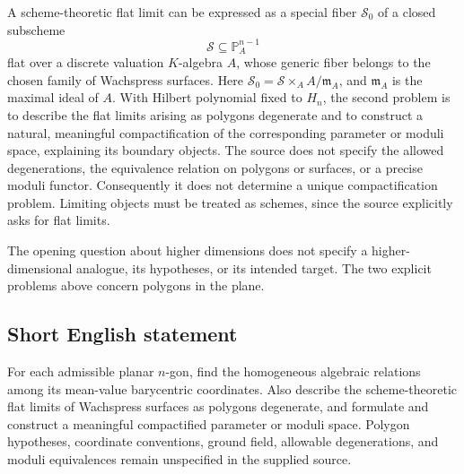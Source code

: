 \documentclass[11pt]{article}
\begin{document}
A scheme-theoretic flat limit can be expressed as a special fiber \(\mathcal S_0\) of a closed subscheme
\[
\mathcal S\subseteq\mathbb P^{n-1}_A
\]
flat over a discrete valuation \(K\)-algebra \(A\), whose generic fiber belongs to the chosen family of Wachspress surfaces. Here \(\mathcal S_0=\mathcal S\times_A A/\mathfrak m_A\), and \(\mathfrak m_A\) is the maximal ideal of \(A\). With Hilbert polynomial fixed to \(H_n\), the second problem is to describe the flat limits arising as polygons degenerate and to construct a natural, meaningful compactification of the corresponding parameter or moduli space, explaining its boundary objects. The source does not specify the allowed degenerations, the equivalence relation on polygons or surfaces, or a precise moduli functor. Consequently it does not determine a unique compactification problem. Limiting objects must be treated as schemes, since the source explicitly asks for flat limits.

The opening question about higher dimensions does not specify a higher-dimensional analogue, its hypotheses, or its intended target. The two explicit problems above concern polygons in the plane.
\subsection{Short English statement}
For each admissible planar \(n\)-gon, find the homogeneous algebraic relations among its mean-value barycentric coordinates. Also describe the scheme-theoretic flat limits of Wachspress surfaces as polygons degenerate, and formulate and construct a meaningful compactified parameter or moduli space. Polygon hypotheses, coordinate conventions, ground field, allowable degenerations, and moduli equivalences remain unspecified in the supplied source.
\end{document}
